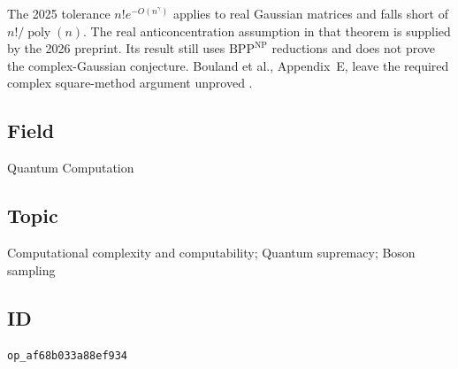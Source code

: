 The 2025 tolerance $n!e^{-O(n^\gamma)}$ applies to real Gaussian matrices and falls short of $n!/\operatorname{poly}(n)$.
The real anticoncentration assumption in that theorem is supplied by the 2026 preprint.
Its result still uses $\mathrm{BPP}^{\mathrm{NP}}$ reductions and does not prove the complex-Gaussian conjecture.
Bouland et al., Appendix~E, leave the required complex square-method argument unproved .

\subsection*{Field}

Quantum Computation

\subsection*{Topic}

Computational complexity and computability; Quantum supremacy; Boson sampling

\subsection*{ID}

\texttt{op\_af68b033a88ef934}
